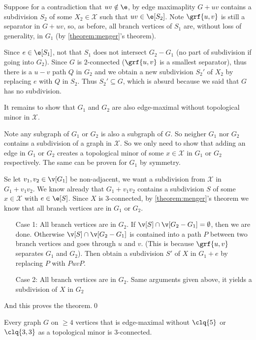 \begin{prf}
\begin{itemize}
        Suppose for a contradiction that $uv \notin \e$, by edge maximaplity $G + uv$ contains a subdivision $S_2$ of some $X_2 \in \mathcal{X}$ such that $uv \in \e[S_2]$. Note $\grf{u, v}$ is still a separator in $G + uv$, so, as before, all branch vertices of $S_1$ are, without loss of generality, in $G_1$ (by \ref{theorem:menger}'s theorem).

        Since $e \in \e[S_1]$, not that $S_1$ does not intersect $G_2 - G_1$ (no part of subdivision if going into $G_2$). Since $G$ is $2$-connected ($\grf{u, v}$ is a smallest separator), thus there is a $u-v$ path $Q$ in $G_2$ and we obtain a new subdivision $S_2'$ of $X_2$ by replacing $e$ with $Q$ in $S_2$. Thus $S_2' \subseteq G$, which is absurd because we said that $G$ has no subdivision.
    \end{itemize}
    It remains to show that $G_1$ and $G_2$ are also edge-maximal without topological minor in $\mathcal{X}$.

    Note any subgraph of $G_1$ or $G_2$ is also a subgraph of $G$. So neigher $G_1$ nor $G_2$ contains a subdivision of a graph in $\mathcal{X}$. So we only need to show that adding an edge in $G_1$ or $G_2$ creates a topological minor of some $x \in \mathcal{X}$ in $G_1$ or $G_2$ respectively. The same can be proven for $G_1$ by symmetry.

    Se let $v_1, v_2 \in \v[G_1]$ be non-adjacent, we want a subdivision from $\mathcal{X}$ in $G_1 + v_1v_2$. We know already that $G_1 + v_1v_2$ contains a subdivision $S$ of some $x \in \mathcal{X}$ with $e \in \e[S]$. Since $X$ is $3$-connected, by \ref{theorem:menger}'s theorem we know that all branch vertices are in $G_1$ or $G_2$.
    \begin{itemize}
        \item[Case 1: ] All branch vertices are in $G_2$. If $\v[S] \cap \v[G_2 - G_1] = \emptyset$, then we are done. Otherwise $\v[S] \cap \v[G_2 - G_1]$ is contained into a path $P$ between two branch vertices and goes through $u$ and $v$. (This is because $\grf{u, v}$ separates $G_1$ and $G_2$). Then obtain a subdivision $S'$ of $X$ in $G_1 + e$ by replacing $P$ with $PuvP$.
        \item[Case 2: ] All branch vertices are in $G_2$. Same arguments given above, it yields a subdivision of $X$ in $G_2$  
    \end{itemize}
    And this proves the theorem.\qed
\end{prf}
\begin{customlemma}{4.18}
\label{lemma:4.18}
    Every graph $G$ on $\geq 4$ vertices that is edge-maximal without $\clq{5}$ or $\clq{3, 3}$ as a topological minor is $3$-connected.
\end{customlemma}
